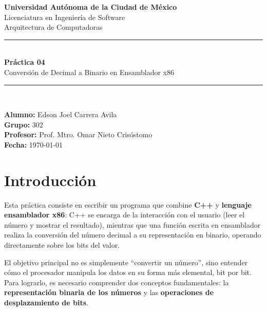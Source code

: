 \documentclass[12pt, letterpaper]{article}
\begin{document}
\begin{titlepage}
    \centering
    \vspace*{1.5cm}

    {\Large \textbf{Universidad Autónoma de la Ciudad de México}}\\[0.3cm]
    {\large Licenciatura en Ingeniería de Software}\\[0.2cm]
    {\large Arquitectura de Computadoras}\\[2.5cm]

    \rule{\linewidth}{0.5pt}\\[0.4cm]
    {\LARGE \bfseries Práctica 04}\\[0.3cm]
    {\Large Conversión de Decimal a Binario en Ensamblador x86}\\[0.3cm]
    \rule{\linewidth}{0.5pt}\\[2cm]

    \begin{flushleft}
        \textbf{Alumno:} Edson Joel Carrera Avila \\[0.3cm]
        \textbf{Grupo:} 302 \\[0.3cm]
        \textbf{Profesor:} Prof. Mtro. Omar Nieto Crisóstomo \\[0.3cm]
        \textbf{Fecha:} \today
    \end{flushleft}
    \vfill
\end{titlepage}

\tableofcontents
\newpage

\section{Introducción}

Esta práctica consiste en escribir un programa que combine \textbf{C++} y \textbf{lenguaje ensamblador x86}: C++ se encarga de la interacción con el usuario (leer el número y mostrar el resultado), mientras que una función escrita en ensamblador realiza la conversión del número decimal a su representación en binario, operando directamente sobre los bits del valor.

El objetivo principal no es simplemente ``convertir un número'', sino entender cómo el procesador manipula los datos en su forma más elemental, bit por bit. Para lograrlo, es necesario comprender dos conceptos fundamentales: la \textbf{representación binaria de los números} y las \textbf{operaciones de desplazamiento de bits}.
\end{document}

